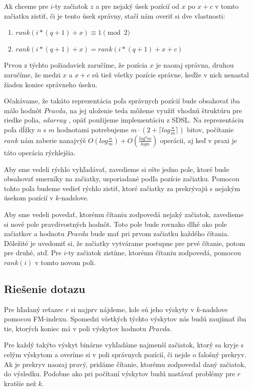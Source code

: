 Ak chceme pre $i$-ty začiatok $z$ a pre nejaký
úsek pozícií od $x$ po $x+c$ v tomto začiatku zistiť, či je tento úsek správny,
stačí nám overiť si dve vlastnosti:
\begin{enumerate}
    \item $rank(i*(q+1) + x) \equiv 1 \pmod{2}$
    \item $rank(i*(q+1) + x) = rank(i*(q+1) + x + c)$
\end{enumerate}
Prvou z týchto požiadaviek zaručíme, že pozícia $x$ je naozaj správna, druhou
zaručíme, že medzi $x$ a $x + c$ sú tiež všetky pozície správne, keďže v nich
nenastal žiaden koniec správneho úseku.

Očakávame, že takáto reprezentácia poľa správnych pozícií bude obsahovať iba
málo hodnôt $Pravda$, na jej uloženie teda môžeme využiť vhodnú štruktúru pre
riedke polia, $sdarray$ \cite{sdarray}, opäť použijeme implementáciu z SDSL.
Na reprezentáciu poľa dĺžky $n$ s $m$ hodnotami potrebujeme $m\cdot(2 + \lceil log\frac{n}{m} \rceil )$
bitov, počítanie $rank$ nám zaberie nanajvýš $O(log \frac{n}{m}) + O(\frac{log^4 m}{log n})$
operácii, aj keď v praxi je táto operácia rýchlejšia.

Aby sme vedeli rýchlo vyhľadávať, zavedieme si ešte jedno pole, ktoré bude
obsahovať smerníky na začiatky, usporiadané podľa pozície začiatku. Pomocou
tohto poľa budeme vedieť rýchlo zistiť, ktoré začiatky za prekrývajú
s nejakým úsekom pozícií v $k$-nadslove.

Aby sme vedeli povedať, ktorému čítaniu zodpovedá nejaký začiatok, zavedieme
si nové pole pravdivostných hodnôt. Toto pole bude rovnako dlhé ako pole začiatkov
a hodnotu $Pravda$ bude mať pri prvom začiatku každého čítania. Dôležité je uvedomiť
si, že začiatky vytvárame postupne pre prvé čítanie, potom pre druhé, atď.
Pre $i$-ty začiatok zistíme, ktorému čítaniu zodpovedá, pomocou $rank(i)$ v tomto novom poli.

\subsection{Riešenie dotazu}

Pre hľadaný reťazec $r$ si najprv nájdeme, kde sú jeho výskyty v $k$-nadslove
pomocou FM-indexu. Spomedzi všetkých týchto výskytov nás budú zaujímať iba tie,
ktorých koniec má v poli výskytov hodnotu $Pravda$.

Pre každý takýto výskyt binárne vyhľadáme najmenší začiatok, ktorý sa kryje s celým
výskytom a overíme si v poli správnych pozícií, či nejde o falošný prekryv.
Ak je prekryv naozaj pravý, pridáme čítanie, ktorému zodpovedal daný začiatok,
do výsledku. Podobne ako pri počítaní výskytov budú nastávať problémy pre $r$
kratšie než $k$.

